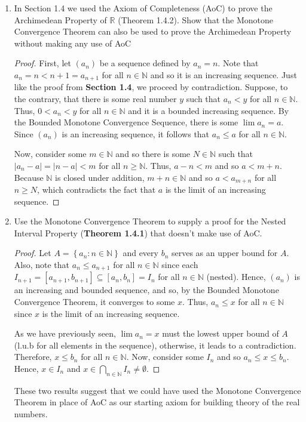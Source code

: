 \documentclass[12pt]{article}
\newcommand{\N}{\mathbb{N}}
\newcommand{\R}{\mathbb{R}}
\newenvironment{problem}[2][Problem]{\begin{trivlist} \item[\hskip \labelsep {\bfseries #1}\hskip \labelsep {\bfseries #2.}]}{\end{trivlist}}
\begin{document}
\begin{problem}{2.4.4}
\begin{enumerate}
  \item In Section 1.4 we used the Axiom of Completeness (AoC) to prove the Archimedean Property of $\R$ (Theorem 1.4.2). Show that the Monotone Convergence Theorem can also be used to prove the Archimedean Property without making any use of AoC
\begin{proof}
  First, let $(a_{n})$ be a sequence defined by $a_{n}=n$. Note that $a_{n}=n<n+1=a_{n+1}$ for all $n\in \N$ and so it is an increasing sequence. Just like the proof from \textbf{Section 1.4}, we proceed by contradiction. Suppose, to the contrary, that there is some real number $y$ such that $a_{n}<y$ for all $n\in \N$. Thus, $0<a_{n}<y$ for all $n\in \N$ and it is a bounded increasing sequence. By the Bounded Monotone Convergence Sequence, there is some $\lim a_{n} = a$. Since $(a_{n})$ is an increasing sequence, it follows that $a_{n} \leq  a$ for all $n\in\N$.

  Now, consider some $m\in \N$ and so there is some $N\in \N$ such that $|a_{n} -a|=|n-a| < m$ for all $n\geq \N$. Thus, $a-n<m$ and so $a<m+n$. Because $\N$ is closed under addition, $m+n\in \N$ and so $a<a_{m+n}$ for all $n\geq N$, which contradicts the fact that $a$ is the limit of an increasing sequence.
\end{proof}
\item Use the Monotone Convergence Theorem to supply a proof for the Nested Interval Property (\textbf{Theorem 1.4.1}) that doesn't make use of AoC.\\
\begin{proof}
  Let $A=\left\{ a_{n}:n\in\N \right\}$ and every $b_{n}$ serves as an upper bound for $A$. Also, note that $a_{n}\leq a_{n+1}$ for all $n\in \N$ since each $I_{n+1} = [a_{n+1},b_{n+1}] \subseteq [a_{n},b_{n}] = I_{n}$ for all $n\in \N$ (nested). Hence, $(a_{n})$ is an increasing and bounded sequence, and so, by the Bounded Monotone Convergence Theorem, it converges to some $x$. Thus, $a_{n} \leq x$ for all $n\in\N$ since $x$ is the limit of an increasing sequence.

  As we have previously seen, $\lim a_{n} = x$ must the lowest upper bound of $A$ (l.u.b for all elements in the sequence), otherwise, it leads to a contradiction. Therefore, $x\leq b_{n}$ for all $n\in\N$. Now, consider some $I_{n}$ and so $a_{n}\leq x \leq b_{n}$. Hence, $x\in I_{n}$ and $x\in \bigcap_{n\in\N} I_{n} \neq \emptyset$.
\end{proof}
  These two results suggest that we could have used the Monotone Convergence Theorem in place of AoC as our starting axiom for building theory of  the real numbers.
\end{enumerate}
\end{problem}
\end{document}
